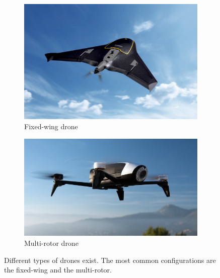 \begin{figure}
\centering
\begin{subfigure}{.5\textwidth}
  \centering
  \includegraphics[width=.9\linewidth]{images/fixed-wings-drone.png}
  \caption{Fixed-wing drone}
  \label{fig:uav-fixed-wing}
\end{subfigure}%
\begin{subfigure}{.5\textwidth}
  \centering
  \includegraphics[width=.9\linewidth]{images/quadrotor.jpg}
  \caption{Multi-rotor drone}
  \label{fig:uav-rotor}
\end{subfigure}
\caption{Different types of drones exist. The most common configurations are the fixed-wing and the multi-rotor.}
\label{fig:uav-types}
\end{figure}


